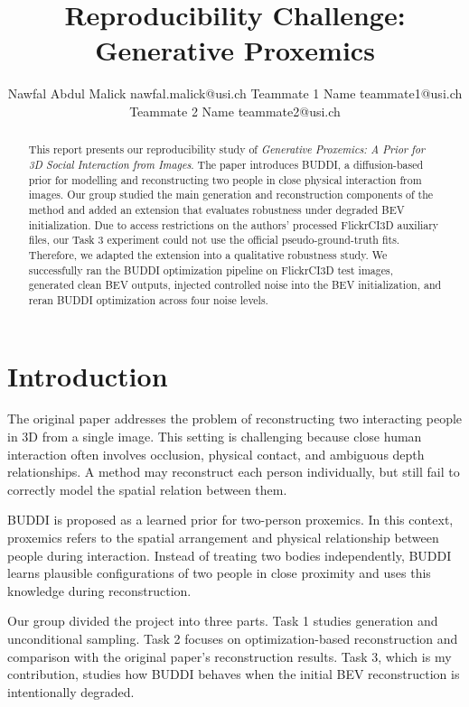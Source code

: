 \documentclass[10pt]{article}
\title{Reproducibility Challenge: Generative Proxemics}
\author{%
  \name Nawfal Abdul Malick \email nawfal.malick@usi.ch
  \AND
  \name Teammate 1 Name \email teammate1@usi.ch
  \AND
  \name Teammate 2 Name \email teammate2@usi.ch
}
\begin{document}
\maketitle

\begin{abstract}
This report presents our reproducibility study of \emph{Generative Proxemics: A Prior for 3D Social Interaction from Images}. The paper introduces BUDDI, a diffusion-based prior for modelling and reconstructing two people in close physical interaction from images. Our group studied the main generation and reconstruction components of the method and added an extension that evaluates robustness under degraded BEV initialization. Due to access restrictions on the authors' processed FlickrCI3D auxiliary files, our Task 3 experiment could not use the official pseudo-ground-truth fits. Therefore, we adapted the extension into a qualitative robustness study. We successfully ran the BUDDI optimization pipeline on FlickrCI3D test images, generated clean BEV outputs, injected controlled noise into the BEV initialization, and reran BUDDI optimization across four noise levels.
\end{abstract}

\section{Introduction}

The original paper addresses the problem of reconstructing two interacting people in 3D from a single image. This setting is challenging because close human interaction often involves occlusion, physical contact, and ambiguous depth relationships. A method may reconstruct each person individually, but still fail to correctly model the spatial relation between them.

BUDDI is proposed as a learned prior for two-person proxemics. In this context, proxemics refers to the spatial arrangement and physical relationship between people during interaction. Instead of treating two bodies independently, BUDDI learns plausible configurations of two people in close proximity and uses this knowledge during reconstruction.

Our group divided the project into three parts. Task 1 studies generation and unconditional sampling. Task 2 focuses on optimization-based reconstruction and comparison with the original paper's reconstruction results. Task 3, which is my contribution, studies how BUDDI behaves when the initial BEV reconstruction is intentionally degraded.
\end{document}
